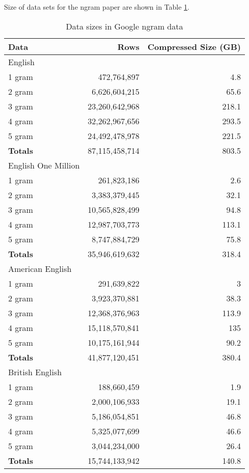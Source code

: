 \documentclass[a4paper]{tufte-handout}
\begin{document}
Size of data sets for the ngram paper are shown in Table \ref{tab:ngram-sizes}.

\begin{table}[p]
  \label{tab:ngram-sizes}
  \centering
  \caption{Data sizes in Google ngram data}
  \begin{tabular}{lrr}
    \toprule
    Data 	&	Rows &	Compressed Size (GB)\\
    \midrule
    English\\
    \midrule
    1 gram &	472,764,897 &	4.8\\
    2 gram &	6,626,604,215 &	65.6\\
    3 gram &	23,260,642,968 &	218.1\\
    4 gram &	32,262,967,656 &	293.5\\
    5 gram &	24,492,478,978 &	221.5\\
    \textbf{Totals} &	87,115,458,714 &	803.5\\
    \midrule
    English One Million\\
    \midrule
    1 gram &	261,823,186 &	2.6\\
    2 gram &	3,383,379,445 &	32.1\\
    3 gram &	10,565,828,499 &	94.8\\
    4 gram &	12,987,703,773 &	113.1\\
    5 gram &	8,747,884,729 &	75.8\\
    \textbf{Totals} &	35,946,619,632 &	318.4\\
    \midrule
    American English\\
    \midrule
    1 gram &	291,639,822 &	3\\
    2 gram &	3,923,370,881 &	38.3\\
    3 gram &	12,368,376,963 &	113.9\\
    4 gram &	15,118,570,841 &	135\\
    5 gram &	10,175,161,944 &	90.2\\
    \textbf{Totals} &	41,877,120,451 &	380.4\\
    \midrule
    British English\\
    \midrule
    1 gram &	188,660,459 &	1.9\\
    2 gram &	2,000,106,933 &	19.1\\
    3 gram &	5,186,054,851 &	46.8\\
    4 gram &	5,325,077,699 &	46.6\\
    5 gram &	3,044,234,000 &	26.4\\
    \textbf{Totals} &	15,744,133,942 &	140.8\\

\end{tabular}
\end{table}
\end{document}
